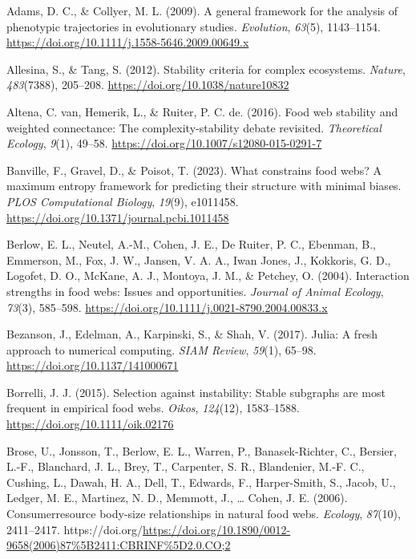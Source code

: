 \documentclass[
]{article}
\newlength{\cslhangindent}
\newenvironment{CSLReferences}[2] %
 {\begin{list}{}{%
  \setlength{\itemindent}{0pt}
  \setlength{\leftmargin}{0pt}
  \setlength{\parsep}{0pt}
  \ifodd #1
   \setlength{\leftmargin}{\cslhangindent}
   \setlength{\itemindent}{-1\cslhangindent}
  \fi
  \setlength{\itemsep}{#2\baselineskip}}}
 {\end{list}}
\begin{document}
\protect{}\label{refs}
\begin{CSLReferences}{1}{0}
Adams, D. C., \& Collyer, M. L. (2009). A general framework for the
analysis of phenotypic trajectories in evolutionary studies.
\emph{Evolution}, \emph{63}(5), 1143--1154.
\url{https://doi.org/10.1111/j.1558-5646.2009.00649.x}

Allesina, S., \& Tang, S. (2012). Stability criteria for complex
ecosystems. \emph{Nature}, \emph{483}(7388), 205--208.
\url{https://doi.org/10.1038/nature10832}

Altena, C. van, Hemerik, L., \& Ruiter, P. C. de. (2016). Food web
stability and weighted connectance: The complexity-stability debate
revisited. \emph{Theoretical Ecology}, \emph{9}(1), 49--58.
\url{https://doi.org/10.1007/s12080-015-0291-7}

Banville, F., Gravel, D., \& Poisot, T. (2023). What constrains food
webs? A maximum entropy framework for predicting their structure with
minimal biases. \emph{PLOS Computational Biology}, \emph{19}(9),
e1011458. \url{https://doi.org/10.1371/journal.pcbi.1011458}

Berlow, E. L., Neutel, A.-M., Cohen, J. E., De Ruiter, P. C., Ebenman,
B., Emmerson, M., Fox, J. W., Jansen, V. A. A., Iwan Jones, J.,
Kokkoris, G. D., Logofet, D. O., McKane, A. J., Montoya, J. M., \&
Petchey, O. (2004). Interaction strengths in food webs: Issues and
opportunities. \emph{Journal of Animal Ecology}, \emph{73}(3), 585--598.
\url{https://doi.org/10.1111/j.0021-8790.2004.00833.x}

Bezanson, J., Edelman, A., Karpinski, S., \& Shah, V. (2017). Julia: A
fresh approach to numerical computing. \emph{SIAM Review}, \emph{59}(1),
65--98. \url{https://doi.org/10.1137/141000671}

Borrelli, J. J. (2015). Selection against instability: Stable subgraphs
are most frequent in empirical food webs. \emph{Oikos}, \emph{124}(12),
1583--1588. \url{https://doi.org/10.1111/oik.02176}

Brose, U., Jonsson, T., Berlow, E. L., Warren, P., Banasek-Richter, C.,
Bersier, L.-F., Blanchard, J. L., Brey, T., Carpenter, S. R.,
Blandenier, M.-F. C., Cushing, L., Dawah, H. A., Dell, T., Edwards, F.,
Harper-Smith, S., Jacob, U., Ledger, M. E., Martinez, N. D., Memmott,
J., \ldots{} Cohen, J. E. (2006). Consumer{\textendash}resource
body-size relationships in natural food webs. \emph{Ecology},
\emph{87}(10), 2411--2417.
https://doi.org/\url{https://doi.org/10.1890/0012-9658(2006)87\%5B2411:CBRINF\%5D2.0.CO;2}


\end{CSLReferences}
\end{document}
